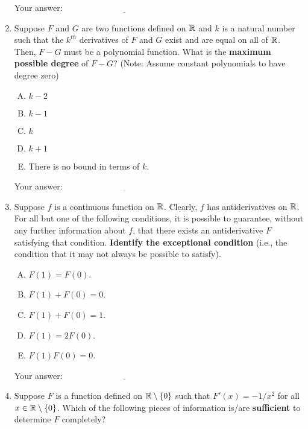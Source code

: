\documentclass[10pt]{amsart}
\begin{document}
\begin{enumerate}
  \vspace{0.05in}
  Your answer: $\underline{\qquad\qquad\qquad\qquad\qquad\qquad\qquad}$
  \vspace{0.05in}

\item Suppose $F$ and $G$ are two functions defined on $\mathbb{R}$ and $k$ is
  a natural number such that the $k^{th}$ derivatives of $F$ and $G$
  exist and are equal on all of $\mathbb{R}$. Then, $F - G$ must be a
  polynomial function. What is the {\bf maximum possible degree} of $F
  - G$?  (Note: Assume constant polynomials to have degree zero) 

  \begin{enumerate}[(A)]
  \item $k - 2$
  \item $k - 1$
  \item $k$
  \item $k + 1$
  \item There is no bound in terms of $k$.
  \end{enumerate}

  \vspace{0.05in}
  Your answer: $\underline{\qquad\qquad\qquad\qquad\qquad\qquad\qquad}$
  \vspace{0.05in}

\item Suppose $f$ is a continuous function on $\mathbb{R}$. Clearly, $f$ has
  antiderivatives on $\mathbb{R}$. For all but one of the following
  conditions, it is possible to guarantee, without any further
  information about $f$, that there exists an antiderivative $F$
  satisfying that condition. {\bf Identify the exceptional condition}
  (i.e., the condition that it may not always be possible to
  satisfy). 

  \begin{enumerate}[(A)]
  \item $F(1) = F(0)$.
  \item $F(1) + F(0) = 0$.
  \item $F(1) + F(0) = 1$.
  \item $F(1) = 2F(0)$.
  \item $F(1)F(0) = 0$.
  \end{enumerate}

  \vspace{0.05in}
  Your answer: $\underline{\qquad\qquad\qquad\qquad\qquad\qquad\qquad}$
  \vspace{0.05in}

\item Suppose $F$ is a function defined on $\mathbb{R} \setminus \{ 0 \}$ such
  that $F'(x) = -1/x^2$ for all $x \in \mathbb{R} \setminus \{ 0 \}$. Which of
  the following pieces of information is/are {\bf sufficient} to determine
  $F$ completely? 


\end{enumerate}
\end{document}
